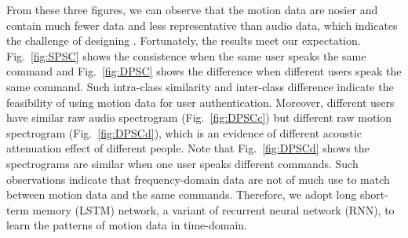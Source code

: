 


%
From these three figures, we can observe that the motion data are nosier and contain much fewer data and less representative than audio data, which indicates the challenge of designing {\shortname}. Fortunately, the results meet our expectation. Fig.~\ref{fig:SPSC} shows the consistence when the same user speaks the same command and Fig.~\ref{fig:DPSC} shows the difference when different users speak the same command. Such intra-class similarity and inter-class difference indicate the feasibility of using motion data for user authentication. Moreover, different users have similar raw audio spectrogram (Fig.~\ref{fig:DPSCc}) but different raw motion spectrogram (Fig.~\ref{fig:DPSCd}), which is an evidence of different acoustic attenuation effect of different people. Note that Fig.~\ref{fig:DPSCd} shows the spectrograms are similar when one user speaks different commands.  Such observations indicate that frequency-domain data are not of much use to match between motion data and the same commands. Therefore, we adopt long short-term memory (LSTM) network, a variant of recurrent neural network (RNN), to learn the patterns of motion data in time-domain. 



